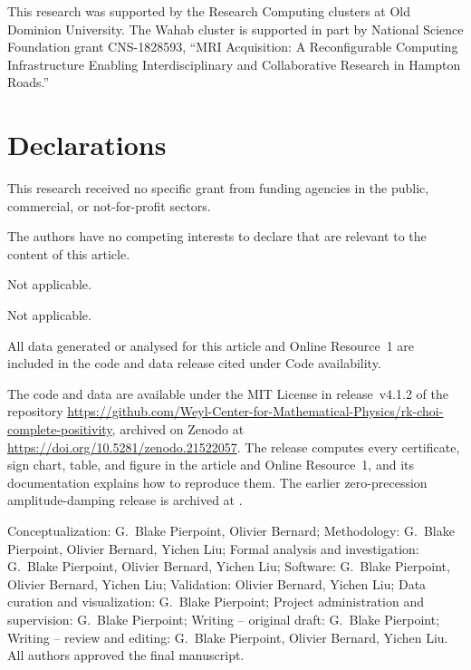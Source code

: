 \documentclass[pdflatex,sn-mathphys-num]{sn-jnl}
\theoremstyle{thmstyleone}
\theoremstyle{thmstylethree}
\theoremstyle{thmstyletwo}
\begin{document}
This research was supported by the Research Computing clusters at Old Dominion University. The Wahab cluster is supported in part by National Science Foundation grant CNS-1828593, ``MRI Acquisition: A Reconfigurable Computing Infrastructure Enabling Interdisciplinary and Collaborative Research in Hampton Roads.''

\section*{Declarations}

This research received no specific grant from funding agencies in the public, commercial, or not-for-profit sectors.

The authors have no competing interests to declare that are relevant to the content of this article.

Not applicable.

Not applicable.

All data generated or analysed for this article and Online Resource~1 are included in the code and data release cited under Code availability.

{\raggedright The code and data are available under the MIT License in release~v4.1.2 of the repository \url{https://github.com/Weyl-Center-for-Mathematical-Physics/rk-choi-complete-positivity}, archived on Zenodo at \url{https://doi.org/10.5281/zenodo.21522057}. The release computes every certificate, sign chart, table, and figure in the article and Online Resource~1, and its documentation explains how to reproduce them. The earlier zero-precession amplitude-damping release is archived at \cite{PierpointBernardLiu2026Zenodo}.\par}

Conceptualization: G.~Blake Pierpoint, Olivier Bernard; Methodology: G.~Blake Pierpoint, Olivier Bernard, Yichen Liu; Formal analysis and investigation: G.~Blake Pierpoint, Olivier Bernard, Yichen Liu; Software: G.~Blake Pierpoint, Olivier Bernard, Yichen Liu; Validation: Olivier Bernard, Yichen Liu; Data curation and visualization: G.~Blake Pierpoint; Project administration and supervision: G.~Blake Pierpoint; Writing -- original draft: G.~Blake Pierpoint; Writing -- review and editing: G.~Blake Pierpoint, Olivier Bernard, Yichen Liu. All authors approved the final manuscript.
\end{document}
